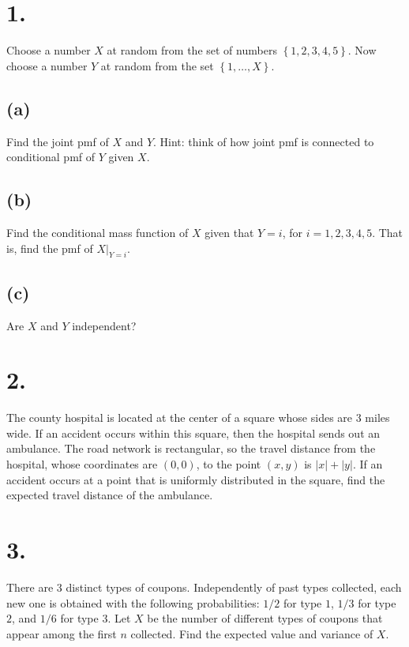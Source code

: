 \documentclass{article}
\begin{document}
\thispagestyle{firstpageheader}

\section*{1.}
{\Large 
Choose a number $X$ at random from the set of numbers
$\left\{ 1,2,3,4,5\right\} $. Now choose a number $Y$ at random
from the set $\left\{ 1,\dots,X\right\} $.

\subsection*{(a)}
Find the joint pmf of $X$ and $Y$. Hint: think of how  joint pmf  is connected to conditional pmf of $Y$ given $X$.

\subsection*{(b)}
Find the conditional mass function of $X$ given that $Y=i$,
for $i=1,2,3,4,5$. That is, find the pmf of $X|_{Y=i}$. 

\subsection*{(c)}
Are $X$ and $Y$ independent?

}

\section*{2.}
{\Large

The county hospital is located at the center of a square
whose sides are $3$ miles wide. If an accident occurs within this
square, then the hospital sends out an ambulance. The road network
is rectangular, so the travel distance from the hospital, whose coordinates
are $(0,0)$, to the point $(x,y)$ is $|x|+|y|$. If an accident
occurs at a point that is uniformly distributed in the square, find
the expected travel distance of the ambulance.

}

\section*{3.}
{\Large 

There are 3 distinct types of coupons. Independently
of past types collected, each new one is obtained with the following
probabilities: $1/2$ for type $1$, $1/3$ for type $2$, and $1/6$
for type $3$. Let $X$ be the number of different types of coupons
that appear among the first $n$ collected. Find the expected value
and variance of $X$.

}
\end{document}
